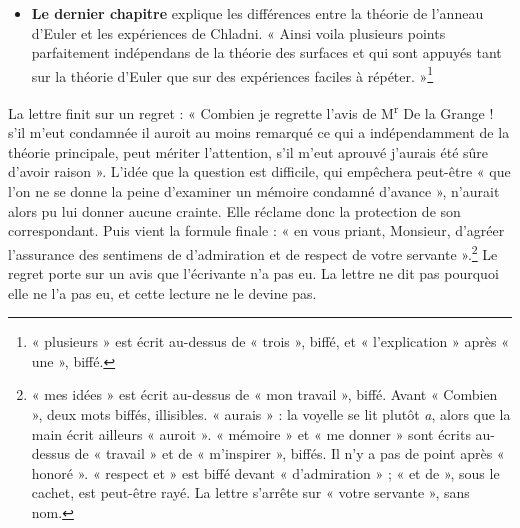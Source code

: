 \documentclass[11pt,a4paper]{article}
\begin{document}
\begin{itemize}
    d'une plaque rectangulaire élastique, on peut tirer d'une portion aussi
    petite qu'on veut le même son que d'une portion de longueur donnée. Elle
    en donne la raison : « les termes qui doivent être nuls aux limites, sont
    l'un et l'autre multipliés par un facteur dépendant de la rigidité
    naturelle ». Au bord libre, en effet, le moment et l'effort tranchant sont
    proportionnels à la rigidité de flexion. Là où une matière non élastique
    remplace la plaque, ces deux conditions sont satisfaites d'elles-mêmes.
    Le paragraphe du mémoire n'est pas dans ce volume, et cette lecture ne
    peut pas vérifier le fait lui-même.\footnote{« hors d'œuvre » est lu avec
    doute, et le « 6 » de « § 6 » est net. « continueroient » (au feuillet
    précédent) a des lettres repassées. Après « les parties », un mot biffé
    illisible, peut-être un premier « séparées ». Sous « multipliés », un petit
    chevron sans appel.}
  \item \textbf{Le dernier chapitre} explique les différences entre la
    théorie de l'anneau d'Euler et les expériences de Chladni. « Ainsi voila
    plusieurs points parfaitement indépendans de la théorie des surfaces et
    qui sont appuyés tant sur la théorie d'Euler que sur des expériences
    faciles à répéter. »\footnote{« plusieurs » est écrit au-dessus de
    « trois », biffé, et « l'explication » après « une », biffé.}
\end{itemize}

La lettre finit sur un regret : « Combien je regrette l'avis de
M\textsuperscript{r} De la Grange ! s'il m'eut condamnée il auroit au moins
remarqué ce qui a indépendamment de la théorie principale, peut mériter
l'attention, s'il m'eut aprouvé j'aurais été sûre d'avoir raison ».
L'idée que la question est difficile, qui empêchera peut-être « que l'on ne se
donne la peine d'examiner un mémoire condamné d'avance », n'aurait alors pu lui
donner aucune crainte. Elle réclame donc la protection de son correspondant.
Puis vient la formule finale : « en vous priant, Monsieur, d'agréer l'assurance
des sentimens de d'admiration et de respect de votre servante ».\footnote{« mes
idées » est écrit au-dessus de « mon travail », biffé. Avant « Combien », deux
mots biffés, illisibles. « aurais » : la voyelle se lit plutôt \emph{a}, alors
que la main écrit ailleurs « auroit ». « mémoire » et « me donner » sont écrits
au-dessus de « travail » et de « m'inspirer », biffés. Il n'y a pas de point
après « honoré ». « respect et » est biffé devant « d'admiration » ; « et de »,
sous le cachet, est peut-être rayé. La lettre s'arrête sur « votre servante »,
sans nom.} Le regret porte sur un avis que l'écrivante n'a pas eu. La lettre
ne dit pas pourquoi elle ne l'a pas eu, et cette lecture ne le devine pas.
\end{document}
